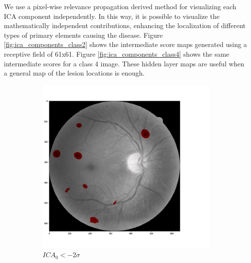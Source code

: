 \documentclass[review]{elsarticle}
\theoremstyle{definition} %
\theoremstyle{remark}
\begin{document}
We use a pixel-wise relevance propagation derived method for visualizing each ICA component independently. In this way, it is possible to visualize the mathematically independent contributions, enhancing the localization of different types of primary elements causing the disease. Figure \ref{fig:ica_components_class2} shows the intermediate score maps generated using a receptive field of 61x61. Figure \ref{fig:ica_components_class4} shows the same intermediate scores for a class 4 image. These hidden layer maps are useful when a general map of the lesion locations is enough.

\begin{figure}[h!]
	\centering
	\begin{subfigure}[b]{0.32\textwidth}
		\centering
		\includegraphics[width=\textwidth]{./figures/img_t2_p2/rf61/ica0.png}
		\caption{$ICA_0 < - 2 \sigma$}	
	\end{subfigure}
	\begin{subfigure}[b]{0.32\textwidth}
		\centering

\end{subfigure}
\end{figure}
\end{document}
